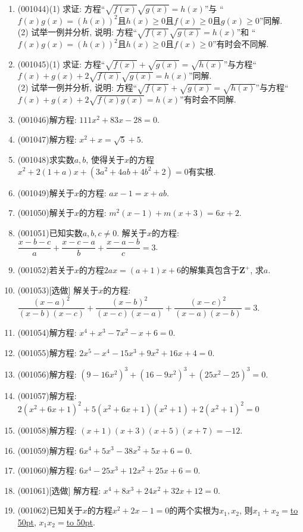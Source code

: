 \documentclass[10pt,a4paper]{article}
\newcommand{\blank}[1]{\underline{\hbox to #1pt{}}}
\begin{document}
\begin{enumerate}[1.]
\item {\tiny (001044)}(1) 求证: 方程``$\sqrt{f(x)}\sqrt{g(x)}=h(x)$''与
``$f(x)g(x)=(h(x))^2$且$h(x)\geq 0$且$f(x)\geq 0$且$g(x)\geq 0$''同解.\\ 
(2) 试举一例并分析, 说明: 方程``$\sqrt{f(x)}\sqrt{g(x)}=h(x)$''和
``$f(x)g(x)=(h(x))^2$且$h(x)\geq 0$且$f(x)\geq 0$''有时会不同解.
\item {\tiny (001045)}(1) 求证: 方程``$\sqrt{f(x)}+\sqrt{g(x)}=\sqrt{h(x)}$''与方程``$f(x)+g(x)+2\sqrt{f(x)}\sqrt{g(x)}=h(x)$''同解.\\ 
(2) 试举一例并分析, 说明: 方程``$\sqrt{f(x)}+\sqrt{g(x)}=\sqrt{h(x)}$''与方程``$f(x)+g(x)+2\sqrt{f(x)g(x)}=h(x)$''有时会不同解.
\item {\tiny (001046)}解方程: $111x^2+83x-28=0$.
\item {\tiny (001047)}解方程: $x^2+x=\sqrt{5}+5$.
\item {\tiny (001048)}求实数$a,b$, 使得关于$x$的方程$x^2+2(1+a)x+(3a^2+4ab+4b^2+2)=0$有实根.
\item {\tiny (001049)}解关于$x$的方程: $ax-1=x+ab$.
\item {\tiny (001050)}解关于$x$的方程: $m^2(x-1)+m(x+3)=6x+2$.
\item {\tiny (001051)}已知实数$a,b,c \ne 0$. 解关于$x$的方程: $\dfrac{x-b-c}{a}+\dfrac{x-c-a}{b}+\dfrac{x-a-b}{c}=3$.
\item {\tiny (001052)}若关于$x$的方程$2ax=(a+1)x+6$的解集真包含于$\mathbf{Z}^+$, 求$a$.
\item {\tiny (001053)}[选做]
解关于$x$的方程: $\dfrac{(x-a)^2}{(x-b)(x-c)}+\dfrac{(x-b)^2}{(x-c)(x-a)}+\dfrac{(x-c)^2}{(x-a)(x-b)}=3$.
\item {\tiny (001054)}解方程: $x^4+x^3-7x^2-x+6=0$.
\item {\tiny (001055)}解方程: $2x^5-x^4-15x^3+9x^2+16x+4=0$.
\item {\tiny (001056)}解方程: $(9-16x^2)^3+(16-9x^2)^3+(25x^2-25)^3=0$.
\item {\tiny (001057)}解方程: $2(x^2+6x+1)^2+5(x^2+6x+1)(x^2+1)+2(x^2+1)^2=0$
\item {\tiny (001058)}解方程: $(x+1)(x+3)(x+5)(x+7)=-12$.
\item {\tiny (001059)}解方程: $6x^4+5x^3-38x^2+5x+6=0$.
\item {\tiny (001060)}解方程: $6x^4-25x^3+12x^2+25x+6=0$.
\item {\tiny (001061)}[选做]
解方程: $x^4+8x^3+24x^2+32x+12=0$.
\item {\tiny (001062)}已知关于$x$的方程$x^2+2x-1=0$的两个实根为$x_1,x_2$, 则$x_1+x_2=$\blank{50}, $x_1x_2=$\blank{50}.

\end{enumerate}
\end{document}
